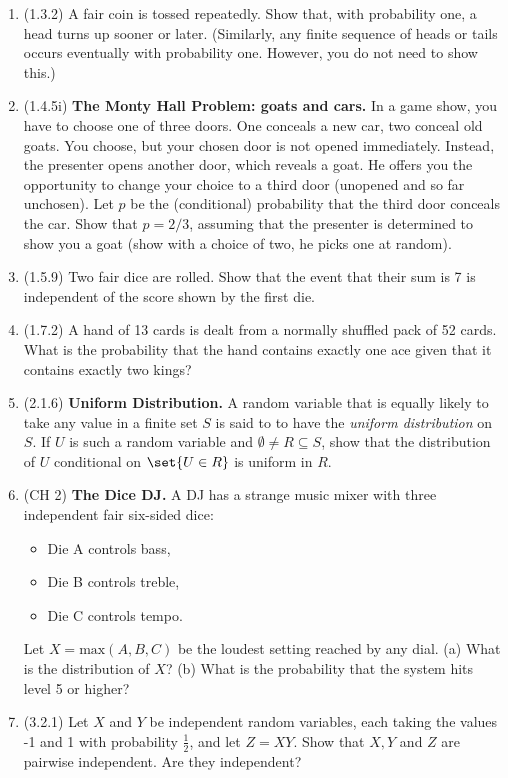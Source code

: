 \documentclass{article} %
\begin{document}
\begin{enumerate}
\item (1.3.2) A fair coin is tossed repeatedly. Show that, with probability one, a head turns up sooner or later.  (Similarly, any finite sequence of heads or tails occurs eventually with probability one. However, you do not need to show this.) 
\item (1.4.5i) \textbf{The Monty Hall Problem: goats and cars.} In a game show, you have to choose one of three doors. One conceals a new car, two conceal old goats. You choose, but your chosen door is not opened immediately. Instead, the presenter opens another door, which reveals a goat.  He offers you the opportunity to change your choice to a third door (unopened and so far unchosen).  Let $p$ be the (conditional) probability that the third door conceals the car.  Show that $p=2/3$, assuming that the presenter is determined to show you a goat (show with a choice of two, he picks one at random).
\item (1.5.9) Two fair dice are rolled. Show that the event that their sum is 7 is independent of the score shown by the first die.
\item (1.7.2) A hand of 13 cards is dealt from a normally shuffled pack of 52 cards. What is the probability that the hand contains exactly one ace given that it contains exactly two kings? 
\item  (2.1.6) \textbf{Uniform Distribution.}  A random variable that is equally likely to take any value in a finite set $S$ is said to to have the \textit{uniform distribution} on $S$.  If $U$ is such a random variable and $\emptyset \neq R \subseteq S$, show that the distribution of $U$ conditional on $\set{U \in R}$ is uniform in $R$.
\item  (CH 2) \textbf{The Dice DJ.}  A DJ has a strange music mixer with three independent fair six-sided dice:
	\noindent
	\begin{itemize} 
	\item Die A controls bass,
	\item Die B controls treble,
	\item Die C controls tempo.
	\end{itemize}
Let $X = \text{max}(A,B,C)$ be the loudest setting reached by any dial. (a) What is the distribution of $X$? (b) What is the probability that the system hits level 5 or higher?
\item (3.2.1) Let $X$ and $Y$ be independent random variables, each taking the values -1 and 1 with probability $\frac{1}{2}$, and let $Z=XY$. Show that $X,Y$ and $Z$ are pairwise independent. Are they independent?

\end{enumerate}
\end{document}
